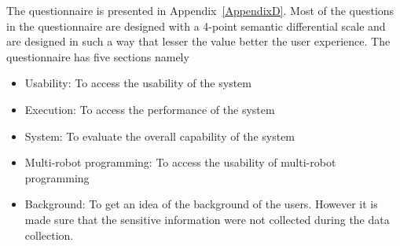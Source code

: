 
The questionnaire is presented in Appendix~\ref{AppendixD}. Most of the questions in the questionnaire are designed with a 4-point semantic differential scale and are designed in such a way that lesser the value better the user experience. The questionnaire has five sections namely
\begin{itemize}
\item Usability: To access the usability of the system
\item Execution: To access the performance of the system
\item System: To evaluate the overall capability of the system
\item Multi-robot programming: To access the usability of multi-robot programming
\item Background: To get an idea of the background of the users. However it is made sure that the sensitive information were not collected during the data collection.
\end{itemize}

